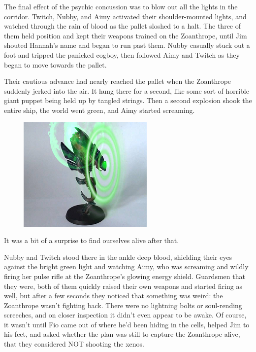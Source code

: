 The final effect of the psychic concussion was to blow out all the lights in the corridor. 
Twitch, Nubby, and Aimy activated their shoulder-mounted lights, and watched through the rain of blood as the pallet sloshed to a halt. 
The three of them held position and kept their weapons trained on the Zoanthrope, until Jim shouted Hannah's name and began to run past them. 
Nubby casually stuck out a foot and tripped the panicked cogboy, then followed Aimy and Twitch as they began to move towards the pallet.

Their cautious advance had nearly reached the pallet when the Zoanthrope suddenly jerked into the air. 
It hung there for a second, like some sort of horrible giant puppet being held up by tangled strings. 
Then a second explosion shook the entire ship, the world went green, and Aimy started screaming.
\begin{figure}
	\begin{center}
		\includegraphics[width=\figwidth]{pics/12/67.png}
	\end{center}
\end{figure}
It was a bit of a surprise to find ourselves alive after that.

Nubby and Twitch stood there in the ankle deep blood, shielding their eyes against the bright green light and watching Aimy, who was screaming and wildly firing her pulse rifle at the Zoanthrope's glowing energy shield. 
Guardsmen that they were, both of them quickly raised their own weapons and started firing as well, but after a few seconds they noticed that something was weird: 
the Zoanthrope wasn't fighting back. 
There were no lightning bolts or soul-rending screeches, and on closer inspection it didn't even appear to be awake. 
Of course, it wasn't until Fio came out of where he'd been hiding in the cells, helped Jim to his feet, and asked whether the plan was still to capture the Zoanthrope alive, that they considered NOT shooting the xenos.

